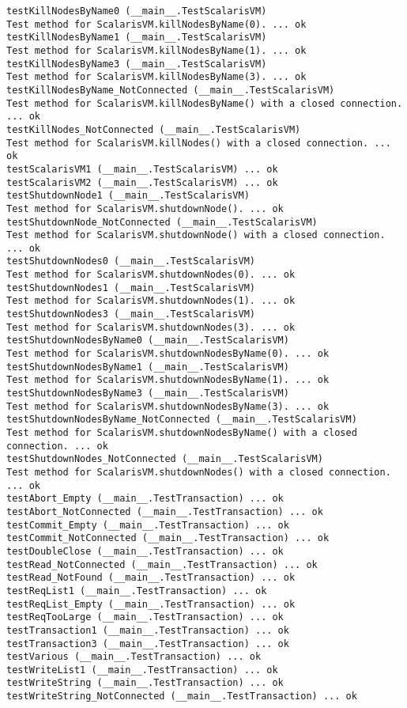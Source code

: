 \begin{lstlisting}[language={}]
testKillNodesByName0 (__main__.TestScalarisVM)
Test method for ScalarisVM.killNodesByName(0). ... ok
testKillNodesByName1 (__main__.TestScalarisVM)
Test method for ScalarisVM.killNodesByName(1). ... ok
testKillNodesByName3 (__main__.TestScalarisVM)
Test method for ScalarisVM.killNodesByName(3). ... ok
testKillNodesByName_NotConnected (__main__.TestScalarisVM)
Test method for ScalarisVM.killNodesByName() with a closed connection. ... ok
testKillNodes_NotConnected (__main__.TestScalarisVM)
Test method for ScalarisVM.killNodes() with a closed connection. ... ok
testScalarisVM1 (__main__.TestScalarisVM) ... ok
testScalarisVM2 (__main__.TestScalarisVM) ... ok
testShutdownNode1 (__main__.TestScalarisVM)
Test method for ScalarisVM.shutdownNode(). ... ok
testShutdownNode_NotConnected (__main__.TestScalarisVM)
Test method for ScalarisVM.shutdownNode() with a closed connection. ... ok
testShutdownNodes0 (__main__.TestScalarisVM)
Test method for ScalarisVM.shutdownNodes(0). ... ok
testShutdownNodes1 (__main__.TestScalarisVM)
Test method for ScalarisVM.shutdownNodes(1). ... ok
testShutdownNodes3 (__main__.TestScalarisVM)
Test method for ScalarisVM.shutdownNodes(3). ... ok
testShutdownNodesByName0 (__main__.TestScalarisVM)
Test method for ScalarisVM.shutdownNodesByName(0). ... ok
testShutdownNodesByName1 (__main__.TestScalarisVM)
Test method for ScalarisVM.shutdownNodesByName(1). ... ok
testShutdownNodesByName3 (__main__.TestScalarisVM)
Test method for ScalarisVM.shutdownNodesByName(3). ... ok
testShutdownNodesByName_NotConnected (__main__.TestScalarisVM)
Test method for ScalarisVM.shutdownNodesByName() with a closed connection. ... ok
testShutdownNodes_NotConnected (__main__.TestScalarisVM)
Test method for ScalarisVM.shutdownNodes() with a closed connection. ... ok
testAbort_Empty (__main__.TestTransaction) ... ok
testAbort_NotConnected (__main__.TestTransaction) ... ok
testCommit_Empty (__main__.TestTransaction) ... ok
testCommit_NotConnected (__main__.TestTransaction) ... ok
testDoubleClose (__main__.TestTransaction) ... ok
testRead_NotConnected (__main__.TestTransaction) ... ok
testRead_NotFound (__main__.TestTransaction) ... ok
testReqList1 (__main__.TestTransaction) ... ok
testReqList_Empty (__main__.TestTransaction) ... ok
testReqTooLarge (__main__.TestTransaction) ... ok
testTransaction1 (__main__.TestTransaction) ... ok
testTransaction3 (__main__.TestTransaction) ... ok
testVarious (__main__.TestTransaction) ... ok
testWriteList1 (__main__.TestTransaction) ... ok
testWriteString (__main__.TestTransaction) ... ok
testWriteString_NotConnected (__main__.TestTransaction) ... ok

\end{lstlisting}

